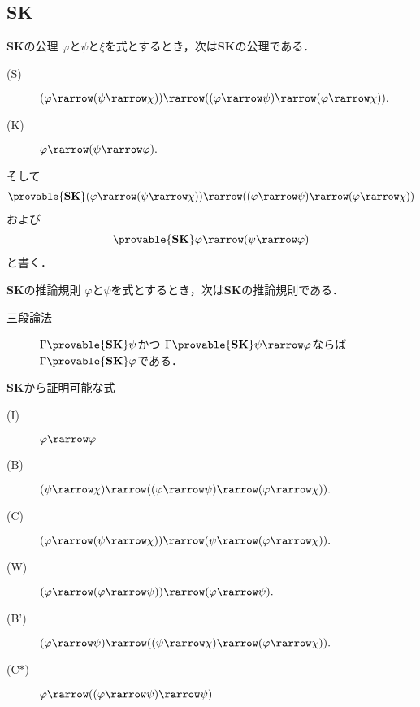 \subsection{{\bf SK}}
	\begin{itembox}[l]{{\bf SK}の公理}
		$\varphi$と$\psi$と$\xi$を式とするとき，次は{\bf SK}の公理である．
		\begin{description}
			\item[(S)] $(\varphi \rarrow (\psi \rarrow \chi)) 
				\rarrow ((\varphi \rarrow \psi)
				\rarrow (\varphi \rarrow \chi)).$
			
			\item[(K)] $\varphi \rarrow (\psi \rarrow \varphi).$
		\end{description}
	\end{itembox}
	
	そして
	\begin{align}
		\provable{\mbox{{\bf SK}}} (\varphi \rarrow (\psi \rarrow \chi)) 
			\rarrow ((\varphi \rarrow \psi)
			\rarrow (\varphi \rarrow \chi))
	\end{align}
	および
	\begin{align}
		\provable{\mbox{{\bf SK}}} \varphi \rarrow (\psi \rarrow \varphi)
	\end{align}
	と書く．
	
	\begin{itembox}[l]{{\bf SK}の推論規則}
		$\varphi$と$\psi$を式とするとき，次は{\bf SK}の推論規則である．
		\begin{description}
			\item[三段論法] $\Gamma \provable{\mbox{{\bf SK}}} \psi$かつ
				$\Gamma \provable{\mbox{{\bf SK}}} \psi \rarrow \varphi$ならば
				$\Gamma \provable{\mbox{{\bf SK}}} \varphi$である．
		\end{description}
	\end{itembox}
	
	{\bf SK}から証明可能な式
	\begin{description}
		\item[(I)] $\varphi \rarrow \varphi$
		\item[(B)] $(\psi \rarrow \chi) \rarrow ((\varphi \rarrow \psi) \rarrow (\varphi \rarrow \chi)).$
		\item[(C)] $(\varphi \rarrow (\psi \rarrow \chi)) \rarrow (\psi \rarrow (\varphi \rarrow \chi)).$
		\item[(W)] $(\varphi \rarrow (\varphi \rarrow \psi)) \rarrow (\varphi \rarrow \psi).$
		\item[(B')] $(\varphi \rarrow \psi) \rarrow ((\psi \rarrow \chi) \rarrow (\varphi \rarrow \chi)).$
		\item[(C$\ast$)] $\varphi \rarrow ((\varphi \rarrow \psi) \rarrow \psi)$
	\end{description}
	
